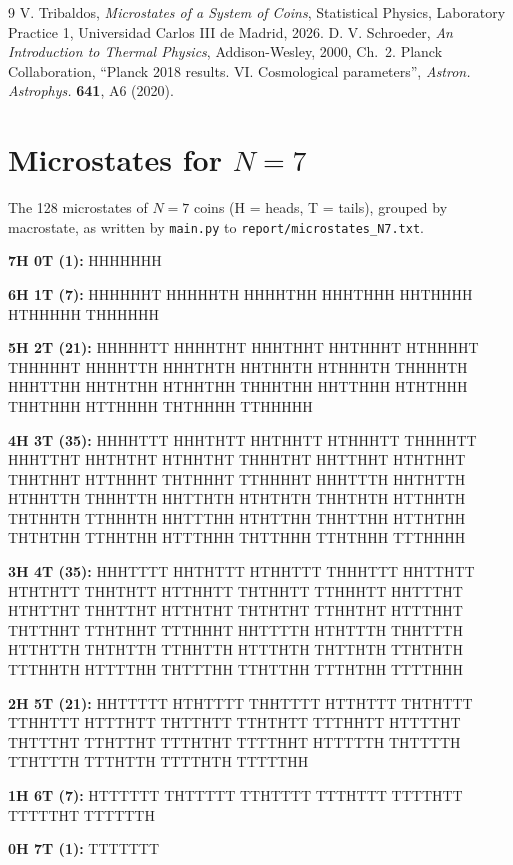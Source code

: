 \documentclass[11pt,a4paper]{article}
\begin{document}
\begin{thebibliography}{9}
   V. Tribaldos, \textit{Microstates of a System of Coins}, Statistical Physics,
  Laboratory Practice 1, Universidad Carlos III de Madrid, 2026.
   D. V. Schroeder, \textit{An Introduction to Thermal Physics}, Addison-Wesley,
  2000, Ch.~2.
   Planck Collaboration, ``Planck 2018 results. VI. Cosmological parameters'',
  \textit{Astron. Astrophys.} \textbf{641}, A6 (2020).
\end{thebibliography}

\appendix
\section{Microstates for \texorpdfstring{$N=7$}{N = 7}}
\label{app:n7}
The 128 microstates of $N=7$ coins (H = heads, T = tails), grouped by macrostate, as written by
\texttt{main.py} to \texttt{report/microstates\_N7.txt}.

{\footnotesize\ttfamily\raggedright
\textbf{7H 0T (1):} HHHHHHH\par\smallskip
\textbf{6H 1T (7):} HHHHHHT HHHHHTH HHHHTHH HHHTHHH HHTHHHH HTHHHHH THHHHHH\par\smallskip
\textbf{5H 2T (21):} HHHHHTT HHHHTHT HHHTHHT HHTHHHT HTHHHHT THHHHHT HHHHTTH HHHTHTH HHTHHTH
HTHHHTH THHHHTH HHHTTHH HHTHTHH HTHHTHH THHHTHH HHTTHHH HTHTHHH THHTHHH HTTHHHH THTHHHH
TTHHHHH\par\smallskip
\textbf{4H 3T (35):} HHHHTTT HHHTHTT HHTHHTT HTHHHTT THHHHTT HHHTTHT HHTHTHT HTHHTHT THHHTHT
HHTTHHT HTHTHHT THHTHHT HTTHHHT THTHHHT TTHHHHT HHHTTTH HHTHTTH HTHHTTH THHHTTH HHTTHTH
HTHTHTH THHTHTH HTTHHTH THTHHTH TTHHHTH HHTTTHH HTHTTHH THHTTHH HTTHTHH THTHTHH TTHHTHH
HTTTHHH THTTHHH TTHTHHH TTTHHHH\par\smallskip
\textbf{3H 4T (35):} HHHTTTT HHTHTTT HTHHTTT THHHTTT HHTTHTT HTHTHTT THHTHTT HTTHHTT THTHHTT
TTHHHTT HHTTTHT HTHTTHT THHTTHT HTTHTHT THTHTHT TTHHTHT HTTTHHT THTTHHT TTHTHHT TTTHHHT
HHTTTTH HTHTTTH THHTTTH HTTHTTH THTHTTH TTHHTTH HTTTHTH THTTHTH TTHTHTH TTTHHTH HTTTTHH
THTTTHH TTHTTHH TTTHTHH TTTTHHH\par\smallskip
\textbf{2H 5T (21):} HHTTTTT HTHTTTT THHTTTT HTTHTTT THTHTTT TTHHTTT HTTTHTT THTTHTT TTHTHTT TTTHHTT HTTTTHT THTTTHT TTHTTHT TTTHTHT TTTTHHT HTTTTTH THTTTTH TTHTTTH TTTHTTH TTTTHTH TTTTTHH\par\smallskip
\textbf{1H 6T (7):} HTTTTTT THTTTTT TTHTTTT TTTHTTT TTTTHTT TTTTTHT TTTTTTH\par\smallskip
\textbf{0H 7T (1):} TTTTTTT\par}
\end{document}
